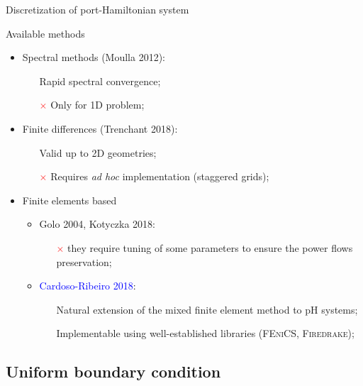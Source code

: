 \documentclass[aspectratio=169]{ISAE-Beamer}
\newcommand{\fenics}{\textsc{FEniCS}\xspace}
\newcommand{\firedrake}{\textsc{Firedrake}\xspace}
\begin{document}
\begin{frame}{Discretization of port-Hamiltonian system}
\begin{exampleblock}{Available methods}
	\begin{itemize}
		\item Spectral methods (Moulla 2012):
		\begin{itemize}
			\item[\textcolor{green}{\checkmark}] Rapid spectral convergence;
			\item[\textcolor{red}{$\times$}] Only for 1D problem;
		\end{itemize}
		\item Finite differences (Trenchant 2018):
		\begin{itemize}
			\item[\textcolor{green}{\checkmark}] Valid up to 2D geometries;
			\item[\textcolor{red}{$\times$}] Requires \textit{ad hoc} implementation (staggered grids);
		\end{itemize}
		\item Finite elements based
		\begin{itemize}
			\item Golo 2004, Kotyczka 2018: 
			\begin{itemize}
				\item[\textcolor{red}{$\times$}] they require tuning of some parameters to ensure the power flows preservation;
			\end{itemize}		
			\item \textcolor{blue}{Cardoso-Ribeiro 2018}:
			\begin{itemize}
				\item[\textcolor{green}{\checkmark}] Natural extension of the mixed finite element method to pH systems;
				\item[\textcolor{green}{\checkmark}] Implementable using well-established libraries (\fenics{}, \firedrake{});
			\end{itemize}
		\end{itemize}
	\end{itemize}
\end{exampleblock}
\end{frame}


\subsection{Uniform boundary condition}
\end{document}
